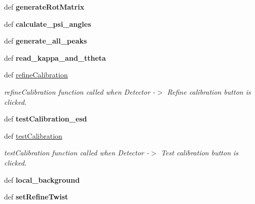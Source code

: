 \begin{DoxyCompactItemize}
\item 
\hypertarget{classmyDetector_1_1myDetector_a6c37e75cc10b463055607b353c08906a}{def {\bfseries generate\-Rot\-Matrix}}\label{classmyDetector_1_1myDetector_a6c37e75cc10b463055607b353c08906a}

\item 
\hypertarget{classmyDetector_1_1myDetector_ae044536621ae1d67732986d2786e89eb}{def {\bfseries calculate\-\_\-psi\-\_\-angles}}\label{classmyDetector_1_1myDetector_ae044536621ae1d67732986d2786e89eb}

\item 
\hypertarget{classmyDetector_1_1myDetector_a4a11ce6f14f52e3cf63340d91dc819db}{def {\bfseries generate\-\_\-all\-\_\-peaks}}\label{classmyDetector_1_1myDetector_a4a11ce6f14f52e3cf63340d91dc819db}

\item 
\hypertarget{classmyDetector_1_1myDetector_ae56669397e5b8160425c0043ce0bd10f}{def {\bfseries read\-\_\-kappa\-\_\-and\-\_\-ttheta}}\label{classmyDetector_1_1myDetector_ae56669397e5b8160425c0043ce0bd10f}

\item 
def \hyperlink{classmyDetector_1_1myDetector_aa92d7038547975e544c7d2cdd019b02d}{refine\-Calibration}
\begin{DoxyCompactList}\small\item\em refine\-Calibration function called when Detector -\/$>$ Refine calibration button is clicked. \end{DoxyCompactList}\item 
\hypertarget{classmyDetector_1_1myDetector_afa3f670ad859220cf67fd6a70574d5da}{def {\bfseries test\-Calibration\-\_\-esd}}\label{classmyDetector_1_1myDetector_afa3f670ad859220cf67fd6a70574d5da}

\item 
def \hyperlink{classmyDetector_1_1myDetector_aa07cdad98650ea99584f29742742c5c5}{test\-Calibration}
\begin{DoxyCompactList}\small\item\em test\-Calibration function called when Detector -\/$>$ Test calibration button is clicked. \end{DoxyCompactList}\item 
\hypertarget{classmyDetector_1_1myDetector_a770f58d5ad78d470084f5644ae55865c}{def {\bfseries local\-\_\-background}}\label{classmyDetector_1_1myDetector_a770f58d5ad78d470084f5644ae55865c}

\item 
\hypertarget{classmyDetector_1_1myDetector_a2d886425496bb5eaf445ad8ec61e53e9}{def {\bfseries set\-Refine\-Twist}}\label{classmyDetector_1_1myDetector_a2d886425496bb5eaf445ad8ec61e53e9}


\end{DoxyCompactItemize}
